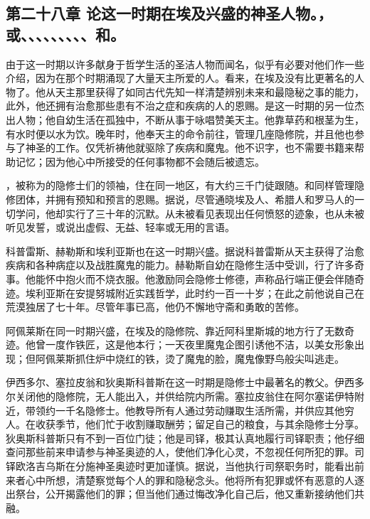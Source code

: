 
\subsection{第二十八章 论这一时期在埃及兴盛的神圣人物。，或、、、、、、、、、和。}

由于这一时期以许多献身于哲学生活的圣洁人物而闻名，似乎有必要对他们作一些介绍，因为在那个时期涌现了大量天主所爱的人。看来，在埃及没有比更著名的人物了。他从天主那里获得了如同古代先知一样清楚辨别未来和最隐秘之事的能力，此外，他还拥有治愈那些患有不治之症和疾病的人的恩赐。是这一时期的另一位杰出人物；他自幼生活在孤独中，不断从事于咏唱赞美天主。他靠草药和根茎为生，有水时便以水为饮。晚年时，他奉天主的命令前往，管理几座隐修院，并且他也参与了神圣的工作。仅凭祈祷他就驱除了疾病和魔鬼。他不识字，也不需要书籍来帮助记忆；因为他心中所接受的任何事物都不会随后被遗忘。\par

，被称为的隐修士们的领袖，住在同一地区，有大约三千门徒跟随。和同样管理隐修团体，并拥有预知和预言的恩赐。据说，尽管通晓埃及人、希腊人和罗马人的一切学问，他却实行了三十年的沉默。从未被看见表现出任何愤怒的迹象，也从未被听见发誓，或说出虚假、无益、轻率或无用的言语。\par

科普雷斯、赫勒斯和埃利亚斯也在这一时期兴盛。据说科普雷斯从天主获得了治愈疾病和各种病症以及战胜魔鬼的能力。赫勒斯自幼在隐修生活中受训，行了许多奇事。他能怀中抱火而不烧衣服。他激励同会隐修士修德，声称品行端正便会伴随奇迹。埃利亚斯在安提努城附近实践哲学，此时约一百一十岁；在此之前他说自己在荒漠独居了七十年。尽管年事已高，他仍不懈地守斋和勇敢的苦修。\par

阿佩莱斯在同一时期兴盛，在埃及的隐修院、靠近阿科里斯城的地方行了无数奇迹。他曾一度作铁匠，这是他本行；一天夜里魔鬼企图引诱他不洁，以美女形象出现；但阿佩莱斯抓住炉中烧红的铁，烫了魔鬼的脸，魔鬼像野鸟般尖叫逃走。\par

伊西多尔、塞拉皮翁和狄奥斯科普斯在这一时期是隐修士中最著名的教父。伊西多尔关闭他的隐修院，无人能出入，并供给院内所需。塞拉皮翁住在阿尔塞诺伊特附近，带领约一千名隐修士。他教导所有人通过劳动赚取生活所需，并供应其他穷人。在收获季节，他们忙于收割赚取酬劳；留足自己的粮食，与其余隐修士分享。狄奥斯科普斯只有不到一百位门徒；他是司铎，极其认真地履行司铎职责；他仔细查问那些前来申请参与神圣奥迹的人，使他们净化心灵，不忽视任何所犯的罪。司铎欧洛吉乌斯在分施神圣奥迹时更加谨慎。据说，当他执行司祭职务时，能看出前来者心中所想，清楚察觉每个人的罪和隐秘念头。他将所有犯罪或怀有恶意的人逐出祭台，公开揭露他们的罪；但当他们通过悔改净化自己后，他又重新接纳他们共融。\par

